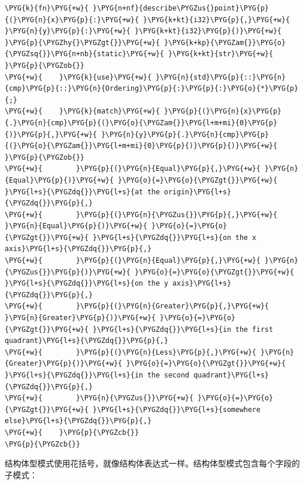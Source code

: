 \begin{Verbatim}[commandchars=\\\{\},breaklines=true,breakanywhere=true,fontsize=\codefont,xleftmargin=17bp]
\PYG{k}{fn}\PYG{+w}{ }\PYG{n+nf}{describe\PYGZus{}point}\PYG{p}{(}\PYG{n}{x}\PYG{p}{:}\PYG{+w}{ }\PYG{k+kt}{i32}\PYG{p}{,}\PYG{+w}{ }\PYG{n}{y}\PYG{p}{:}\PYG{+w}{ }\PYG{k+kt}{i32}\PYG{p}{)}\PYG{+w}{ }\PYG{p}{\PYGZhy{}\PYGZgt{}}\PYG{+w}{ }\PYG{k+kp}{\PYGZam{}}\PYG{o}{\PYGZsq{}}\PYG{n+nb}{static}\PYG{+w}{ }\PYG{k+kt}{str}\PYG{+w}{ }\PYG{p}{\PYGZob{}}
\PYG{+w}{    }\PYG{k}{use}\PYG{+w}{ }\PYG{n}{std}\PYG{p}{::}\PYG{n}{cmp}\PYG{p}{::}\PYG{n}{Ordering}\PYG{p}{:}\PYG{p}{:}\PYG{o}{*}\PYG{p}{;}
\PYG{+w}{    }\PYG{k}{match}\PYG{+w}{ }\PYG{p}{(}\PYG{n}{x}\PYG{p}{.}\PYG{n}{cmp}\PYG{p}{(}\PYG{o}{\PYGZam{}}\PYG{l+m+mi}{0}\PYG{p}{)}\PYG{p}{,}\PYG{+w}{ }\PYG{n}{y}\PYG{p}{.}\PYG{n}{cmp}\PYG{p}{(}\PYG{o}{\PYGZam{}}\PYG{l+m+mi}{0}\PYG{p}{)}\PYG{p}{)}\PYG{+w}{ }\PYG{p}{\PYGZob{}}
\PYG{+w}{        }\PYG{p}{(}\PYG{n}{Equal}\PYG{p}{,}\PYG{+w}{ }\PYG{n}{Equal}\PYG{p}{)}\PYG{+w}{ }\PYG{o}{=}\PYG{o}{\PYGZgt{}}\PYG{+w}{ }\PYG{l+s}{\PYGZdq{}}\PYG{l+s}{at the origin}\PYG{l+s}{\PYGZdq{}}\PYG{p}{,}
\PYG{+w}{        }\PYG{p}{(}\PYG{n}{\PYGZus{}}\PYG{p}{,}\PYG{+w}{ }\PYG{n}{Equal}\PYG{p}{)}\PYG{+w}{ }\PYG{o}{=}\PYG{o}{\PYGZgt{}}\PYG{+w}{ }\PYG{l+s}{\PYGZdq{}}\PYG{l+s}{on the x axis}\PYG{l+s}{\PYGZdq{}}\PYG{p}{,}
\PYG{+w}{        }\PYG{p}{(}\PYG{n}{Equal}\PYG{p}{,}\PYG{+w}{ }\PYG{n}{\PYGZus{}}\PYG{p}{)}\PYG{+w}{ }\PYG{o}{=}\PYG{o}{\PYGZgt{}}\PYG{+w}{ }\PYG{l+s}{\PYGZdq{}}\PYG{l+s}{on the y axis}\PYG{l+s}{\PYGZdq{}}\PYG{p}{,}
\PYG{+w}{        }\PYG{p}{(}\PYG{n}{Greater}\PYG{p}{,}\PYG{+w}{ }\PYG{n}{Greater}\PYG{p}{)}\PYG{+w}{ }\PYG{o}{=}\PYG{o}{\PYGZgt{}}\PYG{+w}{ }\PYG{l+s}{\PYGZdq{}}\PYG{l+s}{in the first quadrant}\PYG{l+s}{\PYGZdq{}}\PYG{p}{,}
\PYG{+w}{        }\PYG{p}{(}\PYG{n}{Less}\PYG{p}{,}\PYG{+w}{ }\PYG{n}{Greater}\PYG{p}{)}\PYG{+w}{ }\PYG{o}{=}\PYG{o}{\PYGZgt{}}\PYG{+w}{ }\PYG{l+s}{\PYGZdq{}}\PYG{l+s}{in the second quadrant}\PYG{l+s}{\PYGZdq{}}\PYG{p}{,}
\PYG{+w}{        }\PYG{n}{\PYGZus{}}\PYG{+w}{ }\PYG{o}{=}\PYG{o}{\PYGZgt{}}\PYG{+w}{ }\PYG{l+s}{\PYGZdq{}}\PYG{l+s}{somewhere else}\PYG{l+s}{\PYGZdq{}}\PYG{p}{,}
\PYG{+w}{    }\PYG{p}{\PYGZcb{}}
\PYG{p}{\PYGZcb{}}
\end{Verbatim}

结构体型模式使用花括号，就像结构体表达式一样。结构体型模式包含每个字段的子模式：

